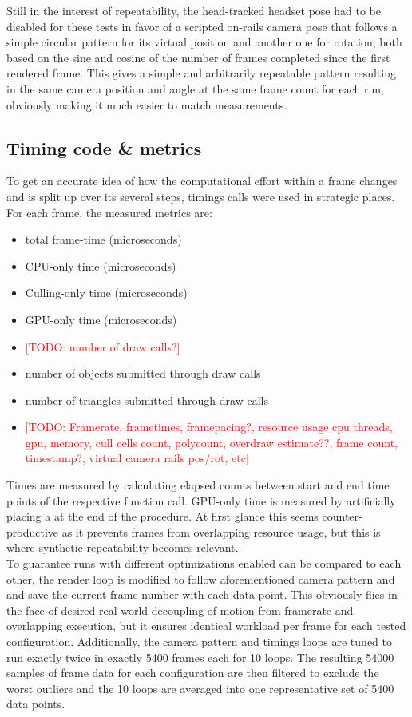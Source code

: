Still in the interest of repeatability, the head-tracked headset pose had to be disabled for these tests in favor of a scripted on-rails camera pose that follows a simple circular pattern for its virtual position and another one for rotation, both based on the sine and cosine of the number of frames completed since the first rendered frame. This gives a simple and arbitrarily repeatable pattern resulting in the same camera position and angle at the same frame count for each run, obviously making it much easier to match measurements. \\

\subsection{Timing code \& metrics}
To get an accurate idea of how the computational effort within a frame changes and is split up over its several steps,  timings calls were used in strategic places. For each frame, the measured metrics are: \begin{itemize}
\item total frame-time (microseconds)
\item CPU-only time (microseconds)
\item Culling-only time (microseconds)
\item GPU-only time (microseconds)
\item \textcolor{red}{[TODO: number of draw calls?]}
\item number of objects submitted through draw calls
\item number of triangles submitted through draw calls
\item \textcolor{red}{[TODO: Framerate, frametimes, framepacing?, resource usage cpu threads, gpu, memory, cull cells count, polycount, overdraw estimate??, frame count, timestamp?, virtual camera rails pos/rot, etc]}
\end{itemize}
Times are measured by calculating elapsed counts between start and end time points of the respective function call. GPU-only time is measured by artificially placing a  at the end of the  procedure. At first glance this seems counter-productive as it prevents frames from overlapping resource usage, but this is where synthetic repeatability becomes relevant. \\
To guarantee runs with different optimizations enabled can be compared to each other, the render loop is modified to follow aforementioned camera pattern and and save the current frame number with each data point. This obviously flies in the face of desired real-world decoupling of motion from framerate and overlapping execution, but it ensures identical workload per frame for each tested configuration. Additionally, the camera pattern and timings loops are tuned to run exactly twice in exactly 5400 frames each for 10 loops. The resulting 54000 samples of frame data for each configuration are then filtered to exclude the worst outliers and the 10 loops are averaged into one representative set of 5400 data points. \\
